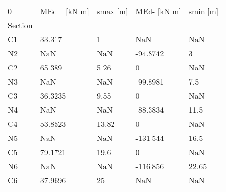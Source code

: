 \begin{tabular}{lllll}
\toprule
0 & MEd+ [kN m] & smax [m] & MEd- [kN m] & smin [m] \\
Section &             &          &             &          \\
\midrule
C1      &      33.317 &        1 &         NaN &      NaN \\
N2      &         NaN &      NaN &    -94.8742 &        3 \\
C2      &      65.389 &     5.26 &           0 &      NaN \\
N3      &         NaN &      NaN &    -99.8981 &      7.5 \\
C3      &     36.3235 &     9.55 &           0 &      NaN \\
N4      &         NaN &      NaN &    -88.3834 &     11.5 \\
C4      &     53.8523 &    13.82 &           0 &      NaN \\
N5      &         NaN &      NaN &    -131.544 &     16.5 \\
C5      &     79.1721 &     19.6 &           0 &      NaN \\
N6      &         NaN &      NaN &    -116.856 &    22.65 \\
C6      &     37.9696 &       25 &         NaN &      NaN \\
\bottomrule
\end{tabular}
